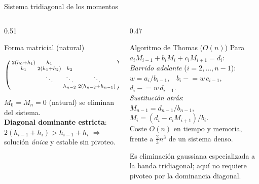\documentclass[aspectratio=169,10pt]{beamer}
\begin{document}
\begin{frame}{Sistema tridiagonal de los momentos}
\begin{columns}[T]
\begin{column}{0.51\textwidth}
\begin{cardidea}{Forma matricial (natural)}{\faSuperscript}
{\footnotesize\centering
$\begin{psmallmatrix}
2(h_0{+}h_1) & h_1 & & \\
h_1 & 2(h_1{+}h_2) & h_2 & \\
& \ddots & \ddots & \ddots \\
& & h_{n-2} & 2(h_{n-2}{+}h_{n-1})
\end{psmallmatrix}\!\begin{psmallmatrix}M_1\\ M_2\\ \vdots\\ M_{n-1}\end{psmallmatrix}=6\begin{psmallmatrix}\delta_1\\ \delta_2\\ \vdots\\ \delta_{n-1}\end{psmallmatrix}$\par\vspace{1.2mm}\raggedright
$M_0=M_n=0$ (natural) se eliminan del sistema.\\[1.0mm]
\textbf{Diagonal dominante estricta}: $2(h_{i-1}{+}h_i)>h_{i-1}{+}h_i$ $\Rightarrow$ solución \emph{única} y estable sin pivoteo.}
\end{cardidea}
\end{column}
\begin{column}{0.47\textwidth}
\begin{cardgear}{Algoritmo de Thomas ($O(n)$)}{\faCalculator}
{\footnotesize Para $a_iM_{i-1}+b_iM_i+c_iM_{i+1}=d_i$:\\[0.8mm]
\emph{Barrido adelante} ($i=2,\dots,n{-}1$):\\[0.2mm]
$w=a_i/b_{i-1}$,\ \ $b_i\!\mathrel{-}\!=w\,c_{i-1}$,\ \ $d_i\!\mathrel{-}\!=w\,d_{i-1}$.\\[0.8mm]
\emph{Sustitución atrás}:\\[0.2mm]
$M_{n-1}=d_{n-1}/b_{n-1}$,\\[0.2mm]
$M_i=(d_i-c_iM_{i+1})/b_i$.\\[1.0mm]
Coste $O(n)$ en tiempo y memoria, frente a $\tfrac23 n^3$ de un sistema denso.}
\end{cardgear}
\vspace{1mm}
\begin{cardnota}[\faInfoCircle]
{\footnotesize Es eliminación gaussiana especializada a la banda tridiagonal; aquí no requiere pivoteo por la dominancia diagonal.}
\end{cardnota}
\end{column}
\end{columns}
\end{frame}
\end{document}
